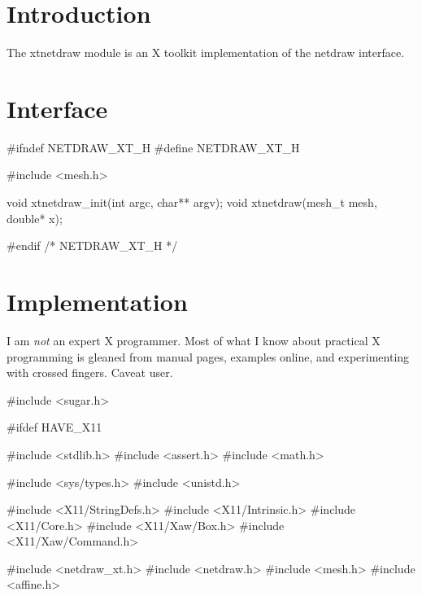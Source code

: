 \section{Introduction}%

The {\Tt{}xtnetdraw\nwendquote} module is an X toolkit implementation of the
{\Tt{}netdraw\nwendquote} interface.


\section{Interface}

\endmoddef\nwstartdeflinemarkup\nwenddeflinemarkup
#ifndef NETDRAW_XT_H
#define NETDRAW_XT_H

#include <mesh.h>

void xtnetdraw_init(int argc, char** argv);
void xtnetdraw(mesh_t mesh, double* x);

#endif /* NETDRAW_XT_H */
\nwendcode{}\nwdocspar


\section{Implementation}

I am \emph{not} an expert X programmer.  Most of what I know about
practical X programming is gleaned from manual pages, examples online,
and experimenting with crossed fingers.  Caveat user.

\nwenddocs{}\endmoddef\nwstartdeflinemarkup\nwenddeflinemarkup
#include <sugar.h>

#ifdef HAVE_X11

#include <stdlib.h>
#include <assert.h>
#include <math.h>

#include <sys/types.h>
#include <unistd.h>

#include <X11/StringDefs.h>
#include <X11/Intrinsic.h>
#include <X11/Core.h>
#include <X11/Xaw/Box.h>
#include <X11/Xaw/Command.h>

#include <netdraw_xt.h>
#include <netdraw.h>
#include <mesh.h>
#include <affine.h>

